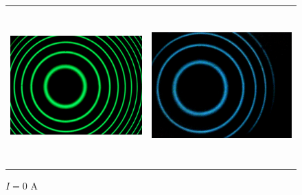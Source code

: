 \documentclass[a4paper,12pt,abstracton]{scrartcl}
\begin{document}
\begin{figure}[H]
\begin{tabular}{c c}
      \includegraphics[width=7.5cm,keepaspectratio]{images/za0.png} & \includegraphics[height=6cm,keepaspectratio]{images/zal0.png} \\
      \end{tabular}
    \caption{$I=0$ A }
    \label{fig:B0}
\end{figure}
\end{document}
